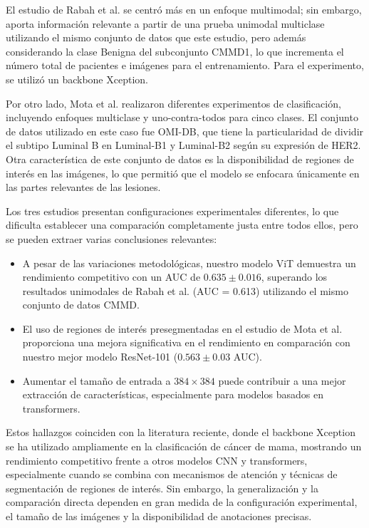 \documentclass[a4paper,10pt]{book}
\begin{document}
El estudio de Rabah et al. se centró más en un enfoque multimodal; sin embargo, aporta información relevante a partir de una prueba unimodal multiclase utilizando el mismo conjunto de datos que este estudio, pero además considerando la clase Benigna del subconjunto CMMD1, lo que incrementa el número total de pacientes e imágenes para el entrenamiento. Para el experimento, se utilizó un backbone Xception.

Por otro lado, Mota et al. realizaron diferentes experimentos de clasificación, incluyendo enfoques multiclase y uno-contra-todos para cinco clases. El conjunto de datos utilizado en este caso fue OMI-DB, que tiene la particularidad de dividir el subtipo Luminal B en Luminal-B1 y Luminal-B2 según su expresión de HER2. Otra característica de este conjunto de datos es la disponibilidad de regiones de interés en las imágenes, lo que permitió que el modelo se enfocara únicamente en las partes relevantes de las lesiones.

Los tres estudios presentan configuraciones experimentales diferentes, lo que dificulta establecer una comparación completamente justa entre todos ellos, pero se pueden extraer varias conclusiones relevantes:

\begin{itemize}
\item A pesar de las variaciones metodológicas, nuestro modelo ViT demuestra un rendimiento competitivo con un AUC de $0.635 \pm 0.016$, superando los resultados unimodales de Rabah et al. (AUC = 0.613) utilizando el mismo conjunto de datos CMMD.
\item El uso de regiones de interés presegmentadas en el estudio de Mota et al. proporciona una mejora significativa en el rendimiento en comparación con nuestro mejor modelo ResNet-101 ($0.563 \pm 0.03$ AUC).
\item Aumentar el tamaño de entrada a $384 \times 384$ puede contribuir a una mejor extracción de características, especialmente para modelos basados en transformers.
\end{itemize}

Estos hallazgos coinciden con la literatura reciente, donde el backbone Xception se ha utilizado ampliamente en la clasificación de cáncer de mama, mostrando un rendimiento competitivo frente a otros modelos CNN y transformers, especialmente cuando se combina con mecanismos de atención y técnicas de segmentación de regiones de interés. Sin embargo, la generalización y la comparación directa dependen en gran medida de la configuración experimental, el tamaño de las imágenes y la disponibilidad de anotaciones precisas.
\end{document}

